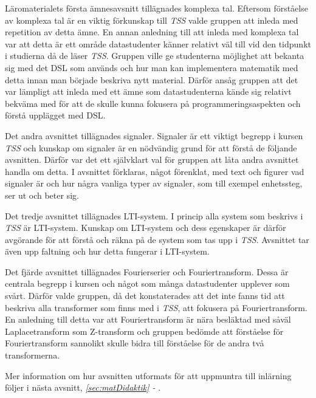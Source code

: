 \documentclass[12pt,a4paper,twoside,openright]{article}
\begin{document}
Läromaterialets första ämnesavsnitt tillägnades komplexa tal. Eftersom
förståelse av komplexa tal är en viktig förkunskap till \textit{TSS}
valde gruppen att inleda med repetition av detta ämne. En annan
anledning till att inleda med komplexa tal var att detta är ett område
datastudenter känner relativt väl till vid den tidpunkt i studierna då
de läser \textit{TSS}. Gruppen ville ge studenterna möjlighet att
bekanta sig med det DSL som används och hur man kan implementera
matematik med detta innan man började beskriva nytt material. Därför
ansåg gruppen att det var lämpligt att inleda med ett ämne som
datastudenterna kände sig relativt bekväma med för att de skulle kunna
fokusera på programmeringsaspekten och förstå upplägget med DSL.

Det andra avsnittet tillägnades signaler. Signaler är ett viktigt
begrepp i kursen \textit{TSS} och kunskap om signaler är en nödvändig
grund för att förstå de följande avsnitten. Därför var det ett
självklart val för gruppen att låta andra avsnittet handla om detta. I
avsnittet förklaras, något förenklat, med text och figurer vad
signaler är och hur några vanliga typer av signaler, som till exempel
enhetssteg, ser ut och beter sig.

Det tredje avsnittet tillägnades LTI-system. I princip alla system som
beskrivs i \textit{TSS} är LTI-system. Kunskap om LTI-system och dess
egenskaper är därför avgörande för att förstå och räkna på de system
som tas upp i \textit{TSS}. Avsnittet tar även upp faltning och hur
detta fungerar i LTI-system.

Det fjärde avsnittet tillägnades Fourierserier och
Fouriertransform. Dessa är centrala begrepp i kursen och något som
många datastudenter upplever som svårt. Därför valde gruppen, då det
konstaterades att det inte fanns tid att beskriva alla transformer som
finns med i \textit{TSS}, att fokusera på Fouriertransform. En
anledning till detta var att Fouriertransform är nära besläktad med
såväl Laplacetransform som Z-transform och gruppen bedömde att
förståelse för Fouriertransform sannolikt skulle bidra till förståelse
för de andra två transformerna.

Mer information om hur avsnitten utformats för att uppmuntra till
inlärning följer i nästa avsnitt, \textit{\ref{sec:matDidaktik} -
  }.
\end{document}
